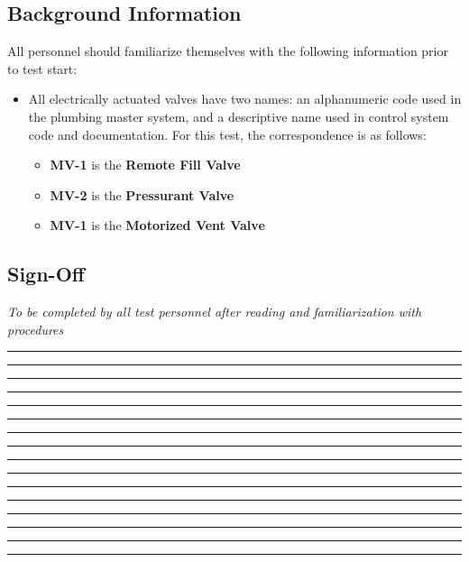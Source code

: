 \subsection{Background Information}
All personnel should familiarize themselves with the following information prior to test start:
\begin{itemize}
    \item All electrically actuated valves have two names: an alphanumeric code used in the plumbing master system, and a descriptive name used in control system code and documentation. For this test, the correspondence is as follows:
    \begin{itemize}
    	\item \textbf{MV-1} is the \textbf{Remote Fill Valve}
	    \item \textbf{MV-2} is the \textbf{Pressurant Valve}
	    \item \textbf{MV-1} is the \textbf{Motorized Vent Valve}
	\end{itemize}
\end{itemize}

\subsection{Sign-Off}
\textit{To be completed by all test personnel after reading and familiarization with procedures}
\begin{checklist}
    \item \opsfull      \tabto{25em}\rule{10em}{0.4pt}\hspace{5em}\rule{10em}{0.4pt}
    \item \primaryfull  \tabto{25em}\rule{10em}{0.4pt}\hspace{5em}\rule{10em}{0.4pt}
    \item \secondaryfull\tabto{25em}\rule{10em}{0.4pt}\hspace{5em}\rule{10em}{0.4pt}
    \item \daqfull      \tabto{25em}\rule{10em}{0.4pt}\hspace{5em}\rule{10em}{0.4pt}
    \item \controlfull  \tabto{25em}\rule{10em}{0.4pt}\hspace{5em}\rule{10em}{0.4pt}
    \item \perifull     \tabto{25em}\rule{10em}{0.4pt}\hspace{5em}\rule{10em}{0.4pt}
    \item \periifull    \tabto{25em}\rule{10em}{0.4pt}\hspace{5em}\rule{10em}{0.4pt}
    \item \periiifull   \tabto{25em}\rule{10em}{0.4pt}\hspace{5em}\rule{10em}{0.4pt}
\end{checklist}
\setcounter{checklistnum}{0}

